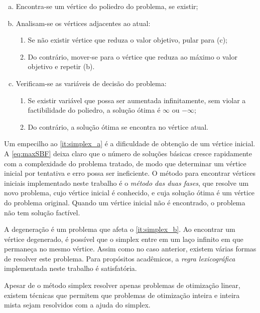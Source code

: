 \begin{enumerate}[(a)]
    \item Encontra-se um vértice do poliedro do problema, se existir;\label{it:simplex_a}
    \item Analisam-se os vértices adjacentes ao atual:\label{it:simplex_b}
    \begin{enumerate}[1.]
        \item Se não existir vértice que reduza o valor objetivo, pular para (c);
        \item Do contrário, mover-se para o vértice que reduza ao máximo o valor objetivo e repetir (b).
    \end{enumerate}
    \item Verificam-se as variáveis de decisão do problema:
    \begin{enumerate}[1.]
        \item Se existir variável que possa ser aumentada infinitamente, sem violar a factibilidade do poliedro, a solução ótima é $\infty$ ou $-\infty$;
        \item Do contrário, a solução ótima se encontra no vértice atual.
    \end{enumerate}
\end{enumerate}

Um empecilho ao \cref{it:simplex_a} é a dificuldade de obtenção de um vértice inicial. A \cref{eq:maxSBF} deixa claro que o número de soluções básicas cresce rapidamente com a complexidade do problema tratado, de modo que determinar um vértice inicial por tentativa e erro possa ser ineficiente. O método para encontrar vértices iniciais implementado neste trabalho é o \emph{método das duas fases}, que resolve um novo problema, cujo vértice inicial é conhecido, e cuja solução ótima é um vértice do problema original. Quando um vértice inicial não é encontrado, o problema não tem solução factível.

A degeneração é um problema que afeta o \cref{it:simplex_b}. Ao encontrar um vértice degenerado, é possível que o simplex entre em um laço infinito em que permaneça no mesmo vértice. Assim como no caso anterior, existem várias formas de resolver este problema. Para propósitos acadêmicos, a \emph{regra lexicográfica} implementada neste trabalho é satisfatória.

Apesar de o método simplex resolver apenas problemas de otimização linear, existem técnicas que permitem que problemas de otimização inteira e inteira mista sejam resolvidos com a ajuda do simplex.